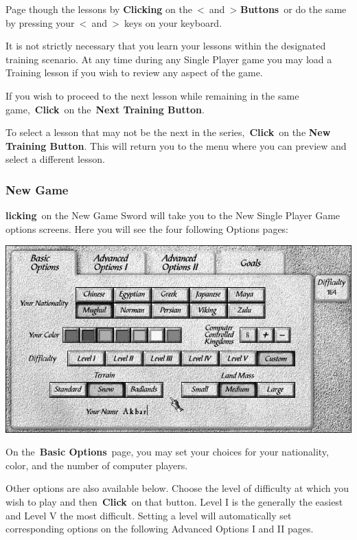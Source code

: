 Page though the lessons by \textbf{Clicking} on the \textless and \textgreater \hspace{1pt} \textbf{Buttons} or do the same by pressing your \textless and \textgreater keys on your keyboard.

It is not strictly necessary that you learn your lessons within the designated training scenario. At any time during any Single Player game you may load a Training lesson if you wish to review any aspect of the game.

If you wish to proceed to the next lesson while remaining in the same game, \textbf{Click} on the \textbf{Next Training Button}.

To select a lesson that may not be the next in the series, \textbf{Click} on the \textbf{New Training Button}. This will return you to the menu where you can preview and select a different lesson.

\subsubsection{New Game}

\textbf{licking} on the New Game Sword will take you to the New Single Player Game options screens. Here you will see the four following Options pages:

\begin{center}
	\includegraphics[width=0.7\linewidth]{Ibasicoptions}
\end{center}

On the \textbf{Basic Options} page, you may set your choices for your nationality, color, and the number of computer players.

Other options are also available below. Choose the level of difficulty at which you wish to play and then \textbf{Click} on that button. Level I is the generally the easiest and Level V the most difficult. Setting a level will automatically set corresponding options on the following Advanced Options I and II pages.

